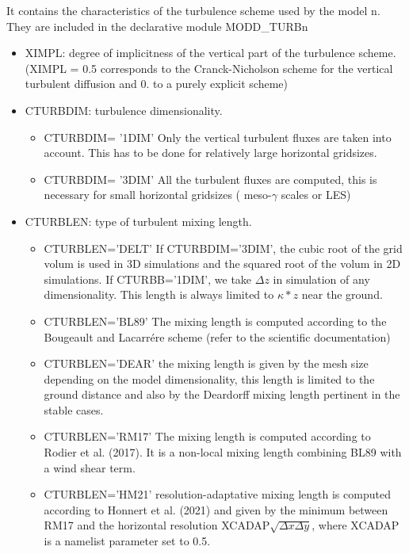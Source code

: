 It contains the characteristics of the turbulence scheme used by the model n. They are
included in the declarative module MODD\_TURBn
\begin{itemize}
\item
{}
XIMPL: degree of implicitness of the vertical part of the turbulence scheme.
(XIMPL = 0.5 corresponds to the Cranck-Nicholson scheme for the vertical
turbulent diffusion and  0. to a purely explicit scheme)
\item
{}
CTURBDIM: turbulence dimensionality. 
\begin{itemize}
\item
CTURBDIM= '1DIM'  Only the vertical turbulent fluxes are taken
into account. This has to be done for relatively large horizontal gridsizes.
\item
CTURBDIM= '3DIM'  All the turbulent fluxes are computed, this is necessary for
small horizontal gridsizes ( meso-$\gamma$ scales or LES)
\end{itemize}

\item
{}
CTURBLEN: type of turbulent mixing length.
\begin{itemize}
\item
CTURBLEN='DELT' If CTURBDIM='3DIM', the cubic root of the grid volum is used
 in 3D simulations and  the squared root of the volum in 2D simulations.
If CTURBB='1DIM', we take 
$\Delta z $ in simulation of any dimensionality. 
This length is always limited to $\kappa * z$  near the ground.
\item
CTURBLEN='BL89'
The mixing length is computed according to the Bougeault and Lacarr\'ere scheme
(refer to the scientific documentation)
\item
CTURBLEN='DEAR'
the mixing length is given by the mesh size depending on the model
dimensionality, this length is limited to the ground distance and
also by the Deardorff mixing length pertinent in the stable cases.
\item
CTURBLEN='RM17'
The mixing length is computed according to Rodier et al. (2017). It is a non-local mixing length combining BL89 with a wind shear term.
\item
CTURBLEN='HM21'
resolution-adaptative mixing length is computed according to Honnert et al. (2021) and given by the minimum between RM17 and the horizontal resolution XCADAP$\sqrt{\Delta x \Delta y}$, where XCADAP is a namelist parameter set to 0.5.
\end{itemize}


\end{itemize}
